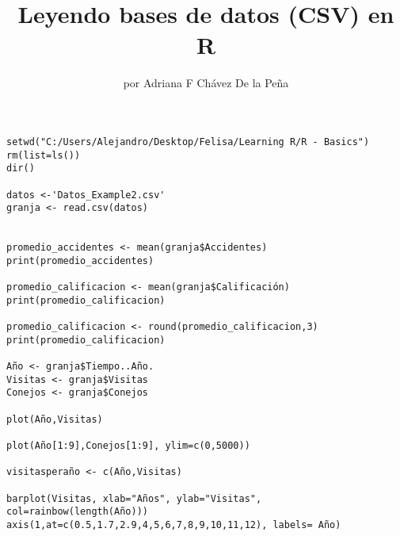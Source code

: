 \documentclass[letterpaper]{article}
\begin{document}
\lstset{language=Pascal}          %
\title{Leyendo bases de datos (CSV) en R}
\author{por Adriana F Ch\'avez De la Pe\~na}
\maketitle

\begin{lstlisting}[frame=single]  % Start your code-block
setwd("C:/Users/Alejandro/Desktop/Felisa/Learning R/R - Basics")
rm(list=ls())
dir()

datos <-'Datos_Example2.csv'
granja <- read.csv(datos)


promedio_accidentes <- mean(granja$Accidentes)
print(promedio_accidentes)

promedio_calificacion <- mean(granja$Calificación)
print(promedio_calificacion)

promedio_calificacion <- round(promedio_calificacion,3)
print(promedio_calificacion)

Año <- granja$Tiempo..Año.
Visitas <- granja$Visitas
Conejos <- granja$Conejos

plot(Año,Visitas)

plot(Año[1:9],Conejos[1:9], ylim=c(0,5000))

visitasperaño <- c(Año,Visitas)

barplot(Visitas, xlab="Años", ylab="Visitas", col=rainbow(length(Año)))
axis(1,at=c(0.5,1.7,2.9,4,5,6,7,8,9,10,11,12), labels= Año)
\end{lstlisting}
\end{document}
